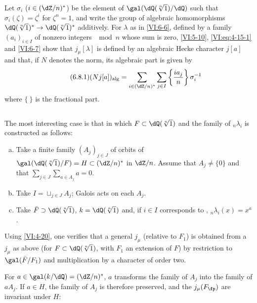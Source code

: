 Let $\sigma_i$ ($i\in (\dZ/n)^\ast$) be the element of 
$\gal(\dQ(\sqrt[n]{1})/\dQ)$ such that $\sigma_i(\zeta)=\zeta^i$ for $\zeta^n=1$, 
and write the group of algebraic homomorphisms 
$\dQ(\sqrt[n]{1})^\ast \to \dQ(\sqrt[n]{1})^\ast$ additively. For $\lambda$ as in 
\ref{VI:6-6}, defined by a family 
$(a_i)_{i\in I}$ of nonzero integers $\mod n$ whose sum is zero, 
\ref{VI:5-10}, \eqref{VI:eq:4-15-1} and \ref{VI:6-7} 
show that $j_\mu[\lambda]$ is defined by an algebraic Hecke character 
$j[a]$ and that, if $N$ denotes the norm, its algebraic part is 
given by 
\begin{equation*}\tag{6.8.1}\label{VI:eq:6-8-1}
  (N j[a])_\text{alg} = \sum_{i\in (\dZ/n)^\ast} \sum_{j\in I} \left\{ \frac{i a_j}{n} \right\} \sigma_i^{-1} 
\end{equation*}
  where $\{\ \}$ is the fractional part. 





\subsection{}\label{VI:6-9}

The most interesting case is that in which $F\subset \dQ(\sqrt[n]{1})$ and 
the family of $_n \lambda_i$ is constructed as follows: 
\begin{enumerate}[a)]
  \item Take a finite family $(A_j)_{j\in J}$ of orbits of 
    $\gal(\dQ(\sqrt[n]{1})/F)=H\subset (\dZ/n)^\ast$ in $\dZ/n$. Assume that 
    $A_j\ne\{0\}$ and that $\sum_{j\in J} \sum_{a\in A_j} a=0$. 
  
\item {}Take $I=\sqcup_{j\in J} A_j$; Galois acts on each $A_j$. 
  \item Take $\bar F\supset \dQ(\sqrt[n]{1})$, $k=\dQ(\sqrt[n]{1})$ and, if 
    $i\in I$ corresponds to , 
    $_n\lambda_i(x)=x^a$. 
\end{enumerate}

Using \ref{VI:4-20}, one verifies that a general $j_\mu$ (relative to 
$F_1$) is obtained from a $j_\mu$ as above (for 
$F\subset \dQ(\sqrt[n]{1})$, with $F_1$ an extension of $F$) by restriction to 
$\gal(\bar F/F_1)$ and multiplication by a character of order two. 

For $a\in \gal(k/\dQ)=(\dZ/n)^\ast$, $a$ transforms the family of $A_j$ 
into the family of $a A_j$. If $a\in H$, the family of $A_j$ is therefore preserved, 
and the $j_\mu(F_\fp)$ are invariant under $H$: 





